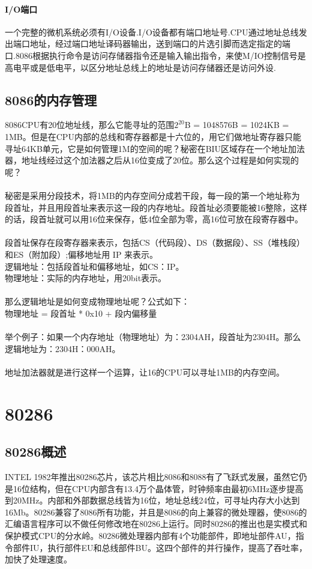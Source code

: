 \documentclass[12pt]{article}
\begin{document}
\paragraph{I/O端口}
一个完整的微机系统必须有I/O设备.I/O设备都有端口地址号.CPU通过地址总线发出端口地址，经过端口地址译码器输出，送到端口的片选引脚而选定指定的端口.8086根据执行命令是访问存储器指令还是输入输出指令，来使M/IO控制信号是高电平或是低电平，以区分地址总线上的地址是访问存储器还是访问外设.

\subsection{8086的内存管理}
8086CPU有20位地址线，那么它能寻址的范围$2^{20}$B = 1048576B = 1024KB = 1MB。但是在CPU内部的总线和寄存器都是十六位的，用它们做地址寄存器只能寻址64KB单元，它是如何管理1M的空间的呢？秘密在BIU区域存在一个地址加法器，地址线经过这个加法器之后从16位变成了20位。那么这个过程是如何实现的呢？\\\\
秘密是采用分段技术，将1MB的内存空间分成若干段，每一段的第一个地址称为段首址，并且用段首址来表示这一段的内存地址。段首址必须要能被16整除，这样的话，段首址就可以用16位来保存，低4位全部为零，高16位可放在段寄存器中。\\\\
段首址保存在段寄存器来表示，包括CS（代码段）、DS（数据段）、SS（堆栈段）和ES（附加段）;偏移地址用 IP 来表示。 \\
逻辑地址：包括段首址和偏移地址，如CS：IP。\\
物理地址：实际的内存地址，用20bit表示。\\\\
那么逻辑地址是如何变成物理地址呢？公式如下：\\
物理地址 = 段首址 * 0x10 + 段内偏移量\\\\
举个例子：如果一个内存地址（物理地址）为：2304AH，段首址为2304H。那么逻辑地址为：2304H：000AH。\\\\
地址加法器就是进行这样一个运算，让16的CPU可以寻址1MB的内存空间。

\section{80286}
\subsection{80286概述}
INTEL 1982年推出80286芯片，该芯片相比8086和8088有了飞跃式发展，虽然它仍是16位结构，但在CPU内部含有13.4万个晶体管，时钟频率由最初6MHz逐步提高到20MHz。内部和外部数据总线皆为16位，地址总线24位，可寻址内存大小达到16Mb。80286兼容了8086所有功能，并且是8086的向上兼容的微处理器，使8086的汇编语言程序可以不做任何修改地在80286上运行。同时80286的推出也是实模式和保护模式CPU的分水岭。80286微处理器内部有4个功能部件，即地址部件AU，指令部件IU，执行部件EU和总线部件BU。这四个部件的并行操作，提高了吞吐率，加快了处理速度。\\\\
\end{document}
